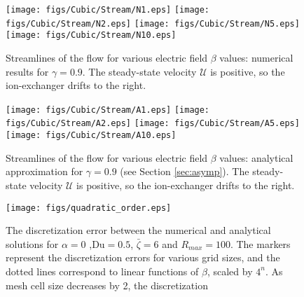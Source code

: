 \documentclass[MSc,beforeExam]{iitcsthesis}
\newcommand\Du{\text{Du}}
\newcommand\cU{\mathscr{U}}
\begin{document}
\begin{figure}
    \begin{center}
	\texttt{[image: figs/Cubic/Stream/N1.eps]}
	\texttt{[image: figs/Cubic/Stream/N2.eps]}
	\texttt{[image: figs/Cubic/Stream/N5.eps]}
	\texttt{[image: figs/Cubic/Stream/N10.eps]}
        \caption[Ion exchanger streamlines -- numerical results]{
        Streamlines of the flow for various electric field $\beta$ values: 
        numerical results for $\gamma = 0.9$.  
        The steady-state velocity $\cU$ is positive, so the
        ion-exchanger drifts to the right. }
    \label{fig:Vortex1}
    \end{center}
\end{figure}

\begin{figure}
    \begin{center}
	\texttt{[image: figs/Cubic/Stream/A1.eps]}
	\texttt{[image: figs/Cubic/Stream/A2.eps]}
	\texttt{[image: figs/Cubic/Stream/A5.eps]}
	\texttt{[image: figs/Cubic/Stream/A10.eps]}
        \caption[Ion exchanger streamlines -- analytical results]{
        Streamlines of the flow for various electric field $\beta$ values: 
        analytical approximation for $\gamma = 0.9$ (see Section \ref{sec:asymp}).
        The steady-state velocity $\cU$ is positive, so the
        ion-exchanger drifts to the right.}
    \label{fig:Vortex2}
    \end{center}
\end{figure}

\begin{figure}
    \begin{center}
    \texttt{[image: figs/quadratic\_order.eps]}
        \caption[Quadratic convergence of steady-state velocity]{
        The discretization error between the numerical and analytical solutions for 
        $\alpha = 0$ ,$\Du = 0.5$, $\bar\zeta = 6$ and $R_{max} = 100$. The markers represent
        the discretization errors for various grid sizes, and the dotted lines correspond to linear
        functions of $\beta$, scaled by $4^n$. As mesh cell size decreases by 2, the discretization
        }
	    \label{fig:quadratic}
    \end{center}
\end{figure}
\end{document}
